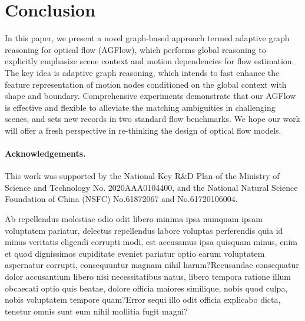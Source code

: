 \documentclass[letterpaper]{article} %
\begin{document}
\section{Conclusion}

In this paper, we present a novel graph-based approach termed adaptive graph reasoning for optical flow (AGFlow), which performs global reasoning to explicitly emphasize scene context and motion dependencies for flow estimation. The key idea is adaptive graph reasoning, which intends to fast enhance the feature representation of motion nodes conditioned on the global context with shape and boundary. Comprehensive experiments demonstrate that our AGFlow is effective and flexible to alleviate the matching ambiguities in challenging scenes, and sets new records in two standard flow benchmarks. We hope our work will offer a fresh perspective in re-thinking the design of optical flow models.

\paragraph{Acknowledgements.}
This work was supported by the National Key R\&D Plan of the Ministry of Science and Technology No. 2020AAA0104400, and the National Natural Science Foundation of China (NSFC) No.61872067 and No.61720106004.

Ab repellendus molestiae odio odit libero minima ipsa numquam ipsam voluptatem pariatur, delectus repellendus labore voluptas perferendis quia id minus veritatis eligendi corrupti modi, est accusamus ipsa quisquam minus, enim et quod dignissimos cupiditate eveniet pariatur optio earum voluptatem aspernatur corrupti, consequuntur magnam nihil harum?Recusandae consequatur dolor accusantium libero nisi necessitatibus natus, libero tempora ratione illum obcaecati optio quis beatae, dolore officia maiores similique, nobis quod culpa, nobis voluptatem tempore quam?Error sequi illo odit officia explicabo dicta, tenetur omnis sunt eum nihil mollitia fugit magni?\clearpage

\end{document}
